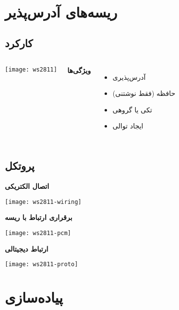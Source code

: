 \documentclass{beamer}
\begin{document}
\section{ریسه‌های آدرس‌پذیر}

\subsection{کارکرد}

\begin{frame}{\subsecname}{\secname}
  \begin{columns}
      \texttt{[image: ws2811]}
      {\centering\textbf{ویژگی‌ها}\par}
      \vspace{1em}

      \begin{itemize}
        \item آدرس‌پذیری
        \item حافظه (فقط نوشتنی)
        \item تکی یا گروهی
        \item ایجاد توالی
      \end{itemize}
  \end{columns}
\end{frame}

\subsection{پروتکل}

\begin{frame}{\subsecname}{\secname}
  \textbf{اتصال الکتریکی}
  \vspace{1em}

  \texttt{[image: ws2811-wiring]}
\end{frame}

\begin{frame}{\subsecname{}}{\secname}
  \textbf{برقراری ارتباط با ریسه}
  \vspace{1em}

  \texttt{[image: ws2811-pcm]}
\end{frame}

\begin{frame}{\subsecname}{\secname}
  \textbf{ارتباط دیجیتالی}

  \texttt{[image: ws2811-proto]}
\end{frame}

\section{پیاده‌سازی}
\end{document}
